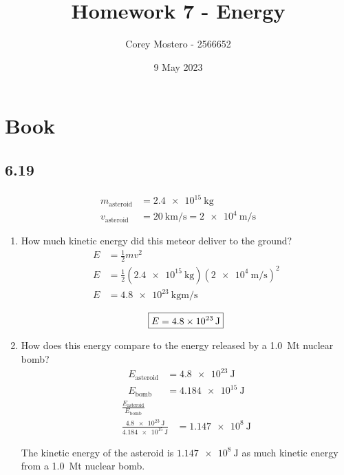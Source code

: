 \documentclass{article}
\title{Homework 7 - Energy}
\author{Corey Mostero - 2566652}
\date{9 May 2023}
\begin{document}
\newcommand{\hr}{\par\noindent\rule{\textwidth}{0.4pt}}

\newcommand{\bc}[1]{
	\begin{equation*}
		\begin{boxed}
			{#1}
		\end{boxed}
	\end{equation*}
}

\newcommand{\cond}[2]{
	\ifmmode
		{#1} \quad {#2}
	\else
		$$ {#1} \quad {#2} $$
	\fi
}

\maketitle
\newpage

\tableofcontents

\section{Book}

\subsection{6.19}

\begin{align*}
	m_\text{asteroid} & = \SI{2.4e15}{\kilogram} \\
	v_\text{asteroid} & = \SI{20}{\kilo \meter \per \second} = \SI{2e4}{\meter \per \second}
\end{align*}
\begin{enumerate}[label = \textbf{(\alph*)}]
	\item How much kinetic energy did this meteor deliver to the ground?
		\begin{align*}
			E & = \frac{1}{2}mv^2 \\
			E & = \frac{1}{2}(\SI{2.4e15}{\kilogram})(\SI{2e4}{\meter \per \second})^2 \\
			E & = \SI{4.8e23}{\kilogram \meter \per \second}
		\end{align*}
		\bc{ E = \SI{4.8e23}{\joule} }
	\item How does this energy compare to the energy released by a \SI{1.0}{\mega \tonne} nuclear bomb?
		\begin{align*}
			E_\text{asteroid} & = \SI{4.8e23}{\joule} \\
			E_\text{bomb} & = \SI{4.184e15}{\joule}
		\end{align*}
		\begin{align*}
			\frac{E_\text{asteroid}}{E_\text{bomb}} & \\
			\frac{\SI{4.8e23}{\joule}}{\SI{4.184e15}{\joule}} & = \SI{1.147e8}{\joule}
		\end{align*}
		\begin{mdframed}
			The kinetic energy of the asteroid is $ \SI{1.147e8}{\joule} $ as much kinetic energy from a \SI{1.0}{\mega \tonne} nuclear bomb.
		\end{mdframed}
\end{enumerate}
\end{document}
